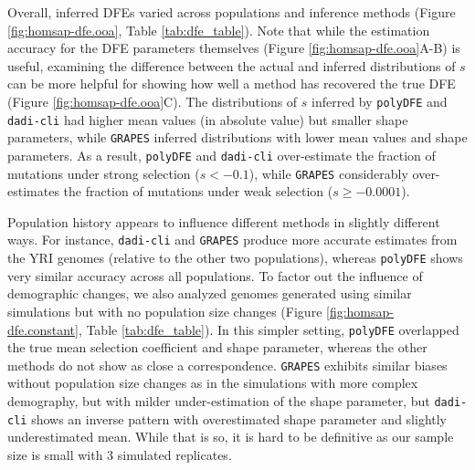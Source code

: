 \documentclass[hidelinks]{article}
\newcommand{\polydfe}{\texttt{polyDFE}\xspace}
\newcommand{\dadicli}{\texttt{dadi-cli}\xspace}
\newcommand{\grapes}{\texttt{GRAPES}\xspace}
\begin{document}
    Overall, inferred DFEs varied across populations and inference methods (Figure \ref{fig:homsap-dfe.ooa}, Table \ref{tab:dfe_table}).
    Note that while the estimation accuracy for the DFE parameters themselves (Figure \ref{fig:homsap-dfe.ooa}A-B) is useful,
    examining the difference between the actual and inferred distributions of $s$ can be more helpful for showing how well a method
    has recovered the true DFE (Figure \ref{fig:homsap-dfe.ooa}C).
    The distributions of $s$ inferred by \polydfe and \dadicli had higher mean values (in absolute value)
    but smaller shape parameters, while \grapes inferred distributions with lower mean values and shape parameters.
    As a result, \polydfe and \dadicli over-estimate the fraction of mutations under strong selection ($s<-0.1$),
    while \grapes considerably over-estimates the fraction of mutations under weak selection ($s\geq-0.0001$).
    
    Population history appears to influence different methods in slightly different ways.
    For instance, \dadicli and \grapes produce more accurate estimates from the YRI genomes 
    (relative to the other two populations), whereas \polydfe
    shows very similar accuracy across all populations.
    To factor out the influence of demographic changes, we also analyzed genomes generated using similar
    simulations but with no population size changes (Figure \ref{fig:homsap-dfe.constant}, Table \ref{tab:dfe_table}).
    In this simpler setting, \polydfe overlapped the true mean selection coefficient and shape parameter, whereas 
    the other methods do not show as close a correspondence.
    \grapes exhibits similar biases without population size changes as in the simulations with more complex demography,
    but with milder under-estimation of the shape parameter, but \dadicli shows an inverse pattern
    with overestimated shape parameter and slightly underestimated mean. 
    While that is so, it is hard to be definitive as our sample size is small with 3 simulated replicates. 
\end{document}
